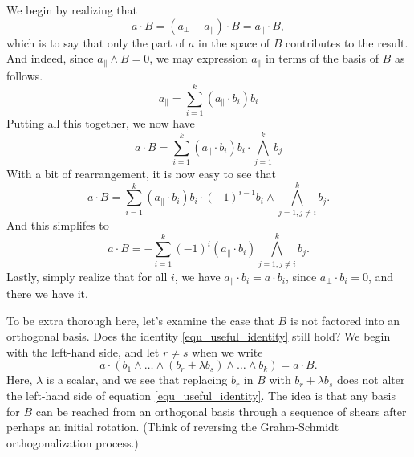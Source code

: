 \documentclass{birkjour}
\newcommand{\prl}{\parallel}
\newcommand{\prp}{\perp}
\begin{document}
We begin by realizing that
\begin{equation}
a\cdot B = (a_{\prp}+a_{\prl})\cdot B = a_{\prl}\cdot B,
\end{equation}
which is to say that only the part of $a$ in the space of $B$ contributes to the result.
And indeed, since $a_{\prl}\wedge B=0$, we may expression $a_{\prl}$ in terms
of the basis of $B$ as follows.
\begin{equation}
a_{\prl}=\sum_{i=1}^k (a_{\prl}\cdot b_i)b_i
\end{equation}
Putting all this together, we now have
\begin{equation}
a\cdot B = \sum_{i=1}^k (a_{\prl}\cdot b_i)b_i\cdot\bigwedge_{j=1}^k b_j
\end{equation}
With a bit of rearrangement, it is now easy to see that
\begin{equation}
a\cdot B = \sum_{i=1}^k (a_{\prl}\cdot b_i)b_i\cdot (-1)^{i-1}b_i\wedge\bigwedge_{j=1,j\neq i}^k b_j.
\end{equation}
And this simplifes to
\begin{equation}
a\cdot B = -\sum_{i=1}^k (-1)^i(a_{\prl}\cdot b_i)\bigwedge_{j=1,j\neq i}^k b_j.
\end{equation}
Lastly, simply realize that for all $i$, we have $a_{\prl}\cdot b_i=a\cdot b_i$, since $a_{\prp}\cdot b_i=0$,
and there we have it.

To be extra thorough here, let's examine the case that $B$ is not factored into an orthogonal basis.
Does the identity \eqref{equ_useful_identity} still hold?  We begin with the left-hand side, and
let $r\neq s$ when we write
\begin{equation}
a\cdot(b_1\wedge\dots\wedge(b_r+\lambda b_s)\wedge\dots\wedge b_k)=a\cdot B.
\end{equation}
Here, $\lambda$ is a scalar, and we see that replacing $b_r$ in $B$ with $b_r+\lambda b_s$ does not alter
the left-hand side of equation \eqref{equ_useful_identity}.  The idea is that any basis for $B$ can be reached from an orthogonal basis through
a sequence of shears after perhaps an initial rotation.  (Think of reversing the Grahm-Schmidt orthogonalization
process.)
\end{document}
